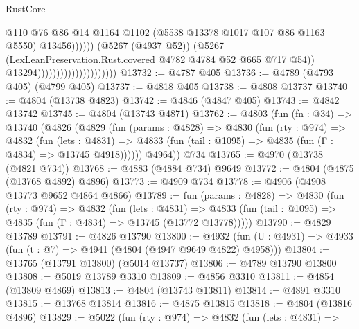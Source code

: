 \begin{lexlean}{RustCore}
\begin{coremodule}
                                                          @110
                                                          @76
                                                          @86
                                                          @14
                                                          @1164
                                                          @1102
                                                          (@5538 @13378 @1017 @107 @86 @1163 @5550)
                                                          @13456))))))
                                              (@5267 (@4937 @52))
                                              (@5267
                                                (LexLeanPreservation.Rust.covered
                                                  @4782
                                                  @4784
                                                  @52
                                                  @665
                                                  @717
                                                  @54))
                                              @13294)))))))))))))))))))))
@13732 := @4787 @405
@13736 := @4789 (@4793 @405) (@4799 @405)
@13737 := @4818 @405
@13738 := @4808 @13737
@13740 := @4804 (@13738 @4823)
@13742 := @4846 (@4847 @405)
@13743 := @4842 @13742
@13745 := @4804 (@13743 @4871)
@13762 := @4803
    (fun (fn : @34) =>
    @13740
      (@4826
        (@4829
          (fun (params : @4828) =>
          @4830
            (fun (rty : @974) =>
            @4832
              (fun (lets : @4831) =>
              @4833 (fun (tail : @1095) => @4835 (fun (Γ : @4834) => @13745 @4918))))))
        @4964))
    @734
@13765 := @4970 (@13738 (@4821 @734))
@13768 := @4883 (@4884 @734) @9649
@13772 := @4804 (@4875 (@13768 @4892) @4896)
@13773 := @4909 @734
@13778 := @4906 (@4908 @13773 @9652 @4864 @4866)
@13789 := fun (params : @4828) =>
  @4830
    (fun (rty : @974) =>
    @4832
      (fun (lets : @4831) =>
      @4833 (fun (tail : @1095) => @4835 (fun (Γ : @4834) => @13745 (@13772 @13778)))))
@13790 := @4829 @13789
@13791 := @4826 @13790
@13800 := @4932 (fun (U : @4931) => @4933 (fun (t : @7) => @4941 (@4804 (@4947 @9649 @4822) @4958)))
@13804 := @13765 (@13791 @13800) (@5014 @13737)
@13806 := @4789 @13790 @13800
@13808 := @5019 @13789 @3310
@13809 := @4856 @3310
@13811 := @4854 (@13809 @4869)
@13813 := @4804 (@13743 @13811)
@13814 := @4891 @3310
@13815 := @13768 @13814
@13816 := @4875 @13815
@13818 := @4804 (@13816 @4896)
@13829 := @5022
    (fun (rty : @974) =>
    @4832
      (fun (lets : @4831) =>

\end{coremodule}
\end{lexlean}
